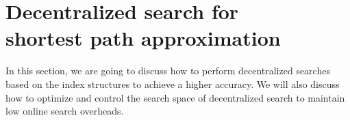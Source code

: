 \section{Decentralized search for \\ shortest path approximation}
\label{searching}

In this section, we are going to discuss how to perform decentralized searches based on the index structures to achieve a higher accuracy. We will also discuss how to optimize and control the search space of decentralized search to maintain low online search overheads.

%
%

